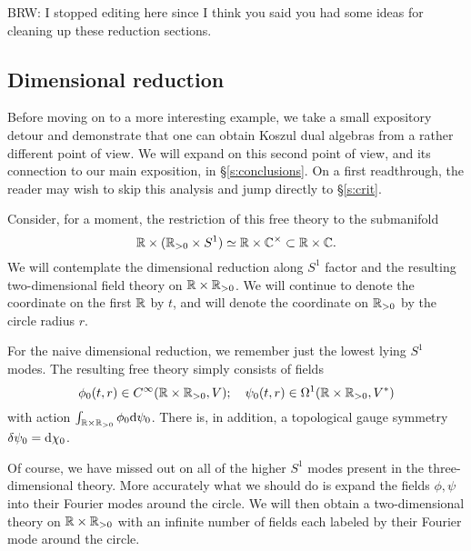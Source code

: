 \documentclass[11pt]{amsart}
\def\brian#1{{\textcolor{blue!65!red}{BRW: {#1}}}}
\begin{document}


\brian{I stopped editing here since I think you said you had some ideas for cleaning up these reduction sections.}

\subsection{Dimensional reduction}

Before moving on to a more interesting example, we take a small expository detour and demonstrate that one can obtain Koszul dual algebras from a rather different point of view. We will expand on this second point of view, and its connection to our main exposition, in \S \ref{s:conclusions}. On a first readthrough, the reader may wish to skip this analysis and jump directly to \S \ref{s:crit}. 

Consider, for a moment, the restriction of this free theory to the submanifold 
\[
\mathbb R \times (\mathbb R_{>0} \times S^1) \simeq \mathbb R \times \mathbb C^\times \subset \mathbb R \times \mathbb C .
\]
We will contemplate the dimensional reduction along $S^1$ factor and the resulting two-dimensional field theory on $\mathbb R \times \mathbb R_{>0}$. 
We will continue to denote the coordinate on the first $\mathbb R$ by $t$, and will denote the coordinate on $\mathbb R_{>0}$ by the circle radius $r$.  

For the naive dimensional reduction, we remember just the lowest lying $S^1$ modes. 
The resulting free theory simply consists of fields
\[
\phi_0(t,r) \in C^\infty(\mathbb R \times \mathbb R_{>0} , V) ; \quad \psi_0 (t,r) \in \Omega^1 (\mathbb R \times \mathbb R_{>0}, V^*) 
\] 
with action $\int_{\mathbb R\times \mathbb R_{>0}} \phi_0 {\rm d} \psi_0$.
There is, in addition, a topological gauge symmetry $\delta \psi_0 = {\rm d} \chi_0$. 

Of course, we have missed out on all of the higher $S^1$ modes present in the three-dimensional theory. 
More accurately what we should do is expand the fields $\phi, \psi$ into their Fourier modes around the circle.
We will then obtain a two-dimensional theory on $\mathbb R \times \mathbb R_{>0}$ with an infinite number of fields each labeled by their Fourier mode around the circle. 
\end{document}
